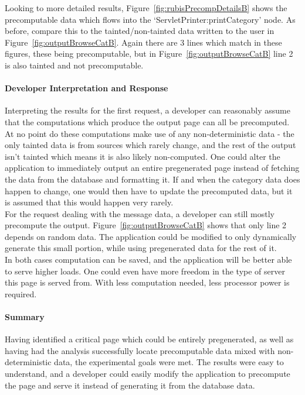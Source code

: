 \documentclass[msc,oneside]{ubcthesis}
\begin{document}
Looking to more detailed results, Figure~\ref{fig:rubisPrecompDetailsB} shows the precomputable data which flows into the `ServletPrinter:printCategory' node. As before, compare this to the tainted/non-tainted data written to the user in Figure~\ref{fig:outputBrowseCatB}. Again there are 3 lines which match in these figures, these being precomputable, but in Figure~\ref{fig:outputBrowseCatB} line 2 is also tainted and not precomputable.

\paragraph{Developer Interpretation and Response}

Interpreting the results for the first request, a developer can reasonably assume that the computations which produce the output page can all be precomputed. At no point do these computations make use of any non-deterministic data - the only tainted data is from sources which rarely change, and the rest of the output isn't tainted which means it is also likely non-computed. One could alter the application to immediately output an entire pregenerated page instead of fetching the data from the database and formatting it. If and when the category data does happen to change, one would then have to update the precomputed data, but it is assumed that this would happen very rarely.\\

For the request dealing with the message data, a developer can still mostly precompute the output. Figure~\ref{fig:outputBrowseCatB} shows that only line 2 depends on random data. The application could be modified to only dynamically generate this small portion, while using pregenerated data for the rest of it.\\

In both cases computation can be saved, and the application will be better able to serve higher loads. One could even have more freedom in the type of server this page is served from. With less computation needed, less processor power is required.

\paragraph{Summary}
Having identified a critical page which could be entirely pregenerated, as well as having had the analysis successfully locate precomputable data mixed with non-deterministic data, the experimental goals were met. The results were easy to understand, and a developer could easily modify the application to precompute the page and serve it instead of generating it from the database data.
\end{document}
